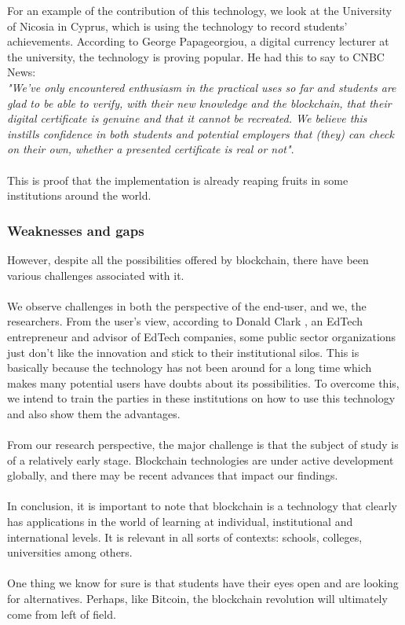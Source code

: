 For an example of the contribution of this technology, we look at the University of Nicosia in Cyprus, which is using the technology to record students' achievements. According to George Papageorgiou, a digital currency lecturer at the university, the technology is proving popular. He had this to say to CNBC News: \\ 
\textit{"We've only encountered enthusiasm in the practical uses so far and students are glad to be able to verify, with their new knowledge and the blockchain, that their digital certificate is genuine and that it cannot be recreated.
We believe this instills confidence in both students and potential employers that (they) can check on their own, whether a presented certificate is real or not"}.\cite{art5} \\ \\
This is proof that the implementation is already reaping fruits in some institutions around the world.



\subsubsection{Weaknesses and gaps}

However, despite all the possibilities offered by blockchain, there have been various challenges associated with it. \\ \\
We observe challenges in both the perspective of the end-user, and we, the researchers. From the user’s view, according to Donald Clark \cite{art6}, an EdTech entrepreneur and advisor of EdTech companies, some public sector organizations just don’t like the innovation and stick to their institutional silos. This is basically because the technology has not been around for a long time which makes many potential users have doubts about its possibilities. To overcome this, we intend to train the parties in these institutions on how to use this technology and also show them the advantages. \\ \\
From our research perspective, the major challenge is that the subject of study is of a relatively early stage. Blockchain technologies are under active development globally, and there may be recent advances that impact our findings. \\ \\
In conclusion, it is important to note that blockchain is a technology that clearly has applications in the world of learning at individual, institutional and international levels. It is relevant in all sorts of contexts: schools, colleges, universities among others. \\ \\
One thing we know for sure is that students have their eyes open and are looking for alternatives. Perhaps, like Bitcoin, the blockchain revolution will ultimately come from left of field.\\ \\

\newpage


